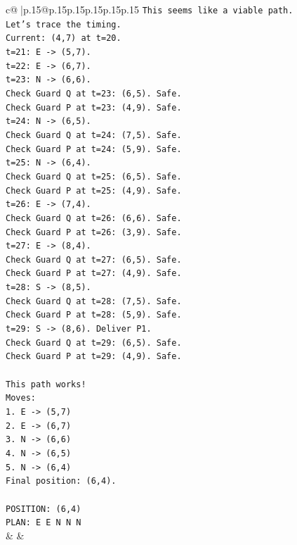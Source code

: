 \documentclass{article}
\begin{document}
{\begin{supertabular}{c@{$\;$}|p{.15\linewidth}@{}p{.15\linewidth}p{.15\linewidth}p{.15\linewidth}p{.15\linewidth}p{.15\linewidth}}
{{{\texttt{This seems like a viable path.} \\
\texttt{Let's trace the timing.} \\
\texttt{Current: (4,7) at t=20.} \\
\texttt{t=21: E {-}> (5,7).} \\
\texttt{t=22: E {-}> (6,7).} \\
\texttt{t=23: N {-}> (6,6).} \\
\texttt{Check Guard Q at t=23: (6,5). Safe.} \\
\texttt{Check Guard P at t=23: (4,9). Safe.} \\
\texttt{t=24: N {-}> (6,5).} \\
\texttt{Check Guard Q at t=24: (7,5). Safe.} \\
\texttt{Check Guard P at t=24: (5,9). Safe.} \\
\texttt{t=25: N {-}> (6,4).} \\
\texttt{Check Guard Q at t=25: (6,5). Safe.} \\
\texttt{Check Guard P at t=25: (4,9). Safe.} \\
\texttt{t=26: E {-}> (7,4).} \\
\texttt{Check Guard Q at t=26: (6,6). Safe.} \\
\texttt{Check Guard P at t=26: (3,9). Safe.} \\
\texttt{t=27: E {-}> (8,4).} \\
\texttt{Check Guard Q at t=27: (6,5). Safe.} \\
\texttt{Check Guard P at t=27: (4,9). Safe.} \\
\texttt{t=28: S {-}> (8,5).} \\
\texttt{Check Guard Q at t=28: (7,5). Safe.} \\
\texttt{Check Guard P at t=28: (5,9). Safe.} \\
\texttt{t=29: S {-}> (8,6). Deliver P1.} \\
\texttt{Check Guard Q at t=29: (6,5). Safe.} \\
\texttt{Check Guard P at t=29: (4,9). Safe.} \\
\\ 
\texttt{This path works!} \\
\texttt{Moves:} \\
\texttt{1. E {-}> (5,7)} \\
\texttt{2. E {-}> (6,7)} \\
\texttt{3. N {-}> (6,6)} \\
\texttt{4. N {-}> (6,5)} \\
\texttt{5. N {-}> (6,4)} \\
\texttt{Final position: (6,4).} \\
\\ 
\texttt{POSITION: (6,4)} \\
\texttt{PLAN: E E N N N} \\
            }
        }
    }
    & & \\ \\


\end{supertabular}}
\end{document}
